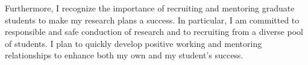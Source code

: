 \documentclass[11pt,a4paper,sans]{moderncv} %
\begin{document}
Furthermore, I recognize the importance of recruiting and mentoring graduate students to make my research plans a success. In particular, I am committed to responsible and safe conduction of research and to recruiting from a diverse pool of students. I plan to quickly develop positive working and mentoring relationships to enhance both my own and my student's success. %
\end{document}
